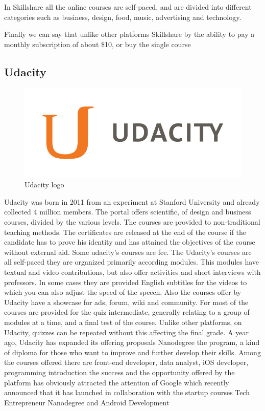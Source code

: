 In Skillshare all the online courses are self-paced, and are divided into different categories such as business, design, food, music, advertising and technology.


Finally we can say that unlike other platforms Skillshare by the ability to pay a monthly subscription of about \$10, or buy the single course


\subsection{Udacity}
\label{subsec:udacity}
\begin{figure}[htb] %
 \centering
 \includegraphics[width=0.5\linewidth]{images/chapter1/udacity.png}\hfill
 \caption[Udacity logo]{Udacity logo}
 \label{fig:fourV}
\end{figure}

Udacity was born in 2011 from an experiment at Stanford University and already collected 4 million members. The portal offers scientific, of design and business courses, divided by the various levels. The courses are provided to non-traditional teaching methods.
The certificates are released at the end of the course if the candidate has to prove his identity and has attained the objectives of the course without external aid. Some udacity's courses are fee.
The Udacity’s courses are all self-paced they are organized primarily according modules. This modules have textual and video contributions, but also offer activities and short interviews with professors. In some cases they are provided English subtitles for the videos to which you can also adjust the speed of the speech.
Also the courses offer by Udacity have a showcase for ads, forum, wiki and community. For most of the courses are provided for the quiz intermediate, generally relating to a group of modules at a time, and a final test of the course. Unlike other platforms, on Udacity, quizzes can be repeated without this affecting the final grade.
A year ago, Udacity has expanded its offering proposals Nanodegree the program, a kind of diploma for those who want to improve and further develop their skills. Among the courses offered there are front-end developer, data analyst, iOS developer, programming introduction
the success and the opportunity offered by the platform has obviously attracted the attention of Google which recently announced that it has launched in collaboration with the startup courses Tech Entrepreneur Nanodegree and Android Development

